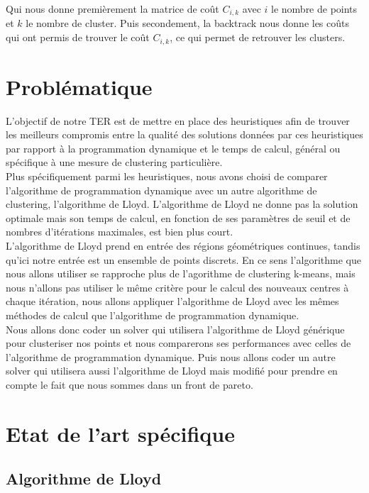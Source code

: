 ﻿\documentclass{meta}
\begin{document}
{Qui nous donne premièrement la matrice de coût $C_{i,k}$ avec $i$ le nombre de points et $k$ le nombre de cluster. Puis secondement, la backtrack nous donne les coûts qui ont permis de trouver le coût $C_{i,k}$, ce qui permet de retrouver les clusters.

\section{Problématique}

L'objectif de notre TER est de mettre en place des heuristiques afin de trouver les meilleurs compromis entre la qualité des solutions données par ces heuristiques par rapport à la programmation dynamique et le temps de calcul, général ou spécifique à une mesure de clustering particulière.\\
Plus spécifiquement parmi les heuristiques, nous avons choisi de comparer l'algorithme de programmation dynamique avec un autre algorithme de clustering, l'algorithme de Lloyd. L'algorithme de Lloyd ne donne pas la solution optimale mais son temps de calcul, en fonction de ses paramètres de seuil et de nombres d'itérations maximales, est bien plus court.\\
L'algorithme de Lloyd prend en entrée des régions géométriques continues, tandis qu'ici notre entrée est un ensemble de points discrets. En ce sens l'algorithme que nous allons utiliser se rapproche plus de l'agorithme de clustering k-means, mais nous n'allons pas utiliser le même critère pour le calcul des nouveaux centres à chaque itération, nous allons appliquer l'algorithme de Lloyd avec les mêmes méthodes de calcul que l'algorithme de programmation dynamique.\\
Nous allons donc coder un solver qui utilisera l'algorithme de Lloyd générique pour clusteriser nos points et nous comparerons ses performances avec celles de l'algorithme de programmation dynamique. Puis nous allons coder un autre solver qui utilisera aussi l'algorithme de Lloyd mais modifié pour prendre en compte le fait que nous sommes dans un front de pareto.

\section{Etat de l'art spécifique}

\subsection{Algorithme de Lloyd}

}
\end{document}
